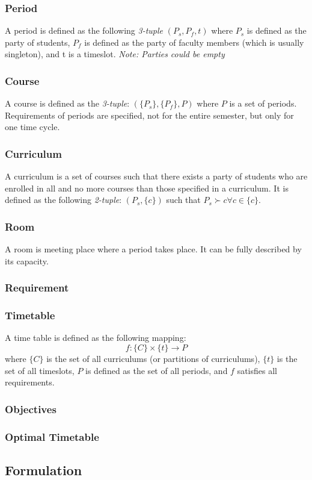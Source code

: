 \documentclass[11pt]{article}
\begin{document}
\subsubsection{Period}
A period is defined as the following \textit{3-tuple} $(P_s, P_f, t)$ where $P_s$ is defined as the party of students, $P_f$ is defined as the party of faculty members (which is usually singleton), and t is a timeslot. \textit{Note: Parties could be empty}

\subsubsection{Course}
A course is defined as the \textit{3-tuple}: $(\{P_s\}, \{P_f\}, P)$ where $P$ is a set of periods. Requirements of periods are specified, not for the entire semester, but only for one time cycle.

\subsubsection{Curriculum}
A curriculum is a set of courses such that there exists a party of students who are enrolled in all and no more courses than those specified in a curriculum. It is defined as the following \textit{2-tuple}: $(P_s, \{c\})$ such that $P_s \succ c \forall c \in \{c\}$.

\subsubsection{Room}
A room is meeting place where a period takes place. It can be fully described by its capacity.

\subsubsection{Requirement}

\subsubsection{Timetable}
A time table is defined as the following mapping:
$$f:\{C\} \times \{t\} \to P$$ 
where $\{C\}$ is the set of all curriculums (or partitions of curriculums), $\{t\}$ is the set of all timeslots, $P$ is defined as the set of all periods, and $f$ satisfies all requirements.

\subsubsection{Objectives}

\subsubsection{Optimal Timetable}

\subsection{Formulation}
\end{document}
